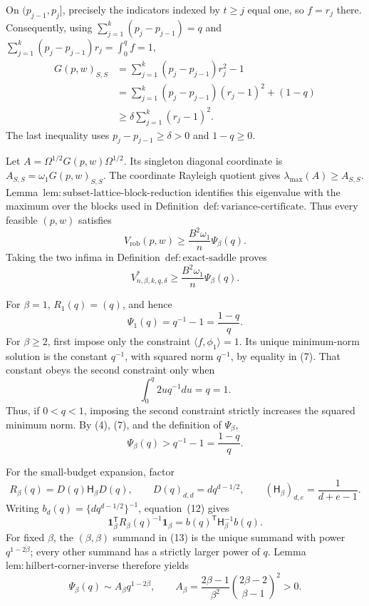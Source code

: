 On \((p_{j-1},p_j]\), precisely the indicators indexed by \(t\ge j\) equal one, so \(f=r_j\) there.  Consequently, using \(\sum_{j=1}^k(p_j-p_{j-1})=q\) and \(\sum_{j=1}^k(p_j-p_{j-1})r_j=\int_0^qf=1\),
\[
\begin{aligned}
G(p,w)_{S,S}
&=\sum_{j=1}^k(p_j-p_{j-1})r_j^2-1\\
&=\sum_{j=1}^k(p_j-p_{j-1})(r_j-1)^2+(1-q)\\
&\ge \delta\sum_{j=1}^k(r_j-1)^2.
\end{aligned}
\tag{8}
\]
The last inequality uses \(p_j-p_{j-1}\ge\delta>0\) and \(1-q\ge0\).

Let \(A=\Omega^{1/2}G(p,w)\Omega^{1/2}\).  Its singleton diagonal coordinate is \(A_{S,S}=\omega_1G(p,w)_{S,S}\).  The coordinate Rayleigh quotient gives \(\lambda_{\max}(A)\ge A_{S,S}\).  Lemma~\(\mathrm{lem{:}subset\text{-}lattice\text{-}block\text{-}reduction}\) identifies this eigenvalue with the maximum over the blocks used in Definition~\(\mathrm{def{:}variance\text{-}certificate}\).  Thus every feasible \((p,w)\) satisfies
\[
V_{\mathrm{rob}}(p,w)
\ge \frac{B^2\omega_1}{n}\Psi_\beta(q).
\]
Taking the two infima in Definition~\(\mathrm{def{:}exact\text{-}saddle}\) proves
\[
V^*_{n,\beta,k,q,\delta}
\ge \frac{B^2\omega_1}{n}\Psi_\beta(q).
\tag{9}
\]

For \(\beta=1\), \(R_1(q)=(q)\), and hence
\[
\Psi_1(q)=q^{-1}-1=\frac{1-q}{q}.
\tag{10}
\]
For \(\beta\ge2\), first impose only the constraint \(\langle f,\phi_1\rangle=1\).  Its unique minimum-norm solution is the constant \(q^{-1}\), with squared norm \(q^{-1}\), by equality in (7).  That constant obeys the second constraint only when
\[
\int_0^q2u q^{-1}du=q=1.
\]
Thus, if \(0<q<1\), imposing the second constraint strictly increases the squared minimum norm.  By (4), (7), and the definition of \(\Psi_\beta\),
\[
\Psi_\beta(q)>q^{-1}-1=\frac{1-q}{q}.
\tag{11}
\]

For the small-budget expansion, factor
\[
R_\beta(q)=D(q)\mathsf H_\beta D(q),
\qquad D(q)_{d,d}=d q^{d-1/2},
\qquad (\mathsf H_\beta)_{d,e}=\frac{1}{d+e-1}.
\tag{12}
\]
Writing \(b_d(q)=\{d q^{d-1/2}\}^{-1}\), equation~(12) gives
\[
\mathbf 1_\beta^{\mathsf T}R_\beta(q)^{-1}\mathbf 1_\beta
=b(q)^{\mathsf T}\mathsf H_\beta^{-1}b(q).
\tag{13}
\]
For fixed \(\beta\), the \((\beta,\beta)\) summand in (13) is the unique summand with power \(q^{1-2\beta}\); every other summand has a strictly larger power of \(q\).  Lemma~\(\mathrm{lem{:}hilbert\text{-}corner\text{-}inverse}\) therefore yields
\[
\Psi_\beta(q)
\sim A_\beta q^{1-2\beta},
\qquad
A_\beta=\frac{2\beta-1}{\beta^2}
\binom{2\beta-2}{\beta-1}^{\!2}>0.
\tag{14}
\]


